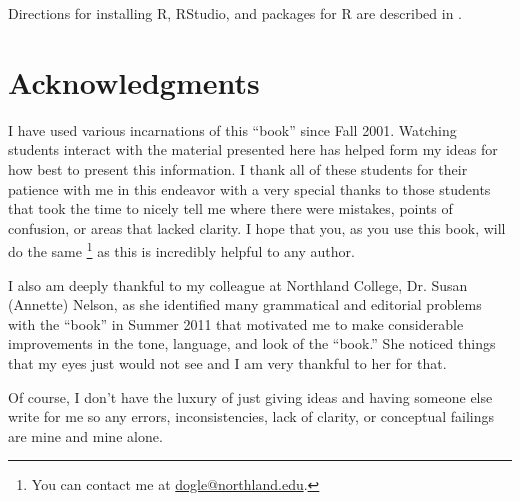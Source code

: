 Directions for installing R, RStudio, and packages for R are described in .

\section*{Acknowledgments}
I have used various incarnations of this ``book'' since Fall 2001.  Watching students interact with the material presented here has helped form my ideas for how best to present this information.  I thank all of these students for their patience with me in this endeavor with a very special thanks to those students that took the time to nicely tell me where there were mistakes, points of confusion, or areas that lacked clarity.  I hope that you, as you use this book, will do the same \footnote{You can contact me at \href{mailto:dogle@northland.edu}{dogle@northland.edu}.} as this is incredibly helpful to any author.

I also am deeply thankful to my colleague at Northland College, Dr. Susan (Annette) Nelson, as she identified many grammatical and editorial problems with the ``book'' in Summer 2011 that motivated me to make considerable improvements in the tone, language, and look of the ``book.''  She noticed things that my eyes just would not see and I am very thankful to her for that.

Of course, I don't have the luxury of just giving ideas and having someone else write for me so any errors, inconsistencies, lack of clarity, or conceptual failings are mine and mine alone.


\setcounter{tocdepth}{0} %

\renewcommand{\cftpartfont}{\scshape}                          %

\setlength{\cftchapindent}{1.5em}                              %
\setlength{\cftbeforechapskip}{0.4em}                          %

\setlength{\cftsecindent}{3.8em}                               %
\setlength{\cftbeforesecskip}{0.2em}                           %

\newpage                                                       %
\tableofcontents                                               %

